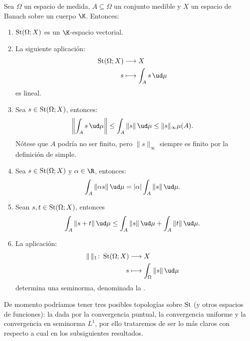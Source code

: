 \begin{prop}
	Sea $\Omega$ un espacio de medida, $A\subseteq\Omega$ un conjunto medible y $X$ un espacio de Banach sobre un cuerpo $\K$.
	Entonces:
	\begin{enumerate}
		\item $\operatorname{St}(\Omega; X)$ es un $\K$-espacio vectorial.
		\item La siguiente aplicación:
			\begin{align*}
				\St(\Omega; X) &\longrightarrow X \\
				s &\longmapsto \int_A s \, \ud\mu
			\end{align*}
			es lineal.
		\item Sea $s \in \operatorname{St}(\Omega; X)$, entonces:
			$$ \left\| \int_A s\, \ud\mu \right\| \le \int_A \|s\| \, \ud\mu \le \|s\|_{\infty} \mu(A). $$
			Nótese que $A$ podría no ser finito, pero $\|s\|_\infty$ siempre es finito por la definición de simple.
		\item Sea $s \in \operatorname{St}(\Omega; X)$ y $\alpha \in \R$, entonces:
			$$ \int_A \| \alpha s \| \, \ud\mu = |\alpha| \int_A \|s\|\, \ud\mu. $$
		\item Sean $s, t \in \operatorname{St}(\Omega; X)$, entonces
			$$ \int_A \|s + t\| \, \ud\mu \le \int_A \|s\| \, \ud\mu + \int_A \|t\| \, \ud\mu. $$
		\item La aplicación:
			\begin{align*}
				\|\,\|_1 \colon \St(\Omega; X) &\longrightarrow X \\
				s &\longmapsto \int_\Omega \|s\| \, \ud\mu
			\end{align*}
			determina una seminorma, denominada la .
	\end{enumerate}
\end{prop}
De momento podríamos tener tres posibles topologías sobre $\operatorname{St}$ (y otros espacios de funciones): la dada por la convergencia puntual, la convergencia uniforme
y la convergencia en seminorma $L^1$, por ello trataremos de ser lo más claros con respecto a cual en los subsiguientes resultados.

